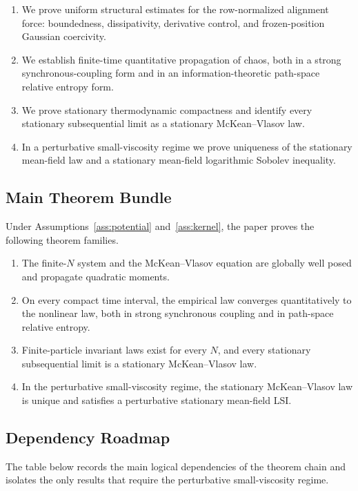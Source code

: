 \documentclass[11pt]{article}
\theoremstyle{definition}
\theoremstyle{remark}
\begin{document}
\begin{enumerate}[leftmargin=1.5em]
\item We prove uniform structural estimates for the row-normalized alignment
force: boundedness, dissipativity, derivative control, and frozen-position
Gaussian coercivity.
\item We establish finite-time quantitative propagation of chaos, both in a
strong synchronous-coupling form and in an information-theoretic path-space
relative entropy form.
\item We prove stationary thermodynamic compactness and identify every
stationary subsequential limit as a stationary McKean--Vlasov law.
\item In a perturbative small-viscosity regime we prove uniqueness of the
stationary mean-field law and a stationary mean-field logarithmic Sobolev
inequality.
\end{enumerate}

\subsection*{Main Theorem Bundle}

Under Assumptions~\ref{ass:potential} and~\ref{ass:kernel}, the paper proves
the following theorem families.
\begin{enumerate}[leftmargin=1.5em]
\item The finite-$N$ system and the McKean--Vlasov equation are globally well
posed and propagate quadratic moments.
\item On every compact time interval, the empirical law converges
quantitatively to the nonlinear law, both in strong synchronous coupling and in
path-space relative entropy.
\item Finite-particle invariant laws exist for every \(N\), and every
stationary subsequential limit is a stationary McKean--Vlasov law.
\item In the perturbative small-viscosity regime, the stationary
McKean--Vlasov law is unique and satisfies a perturbative stationary
mean-field LSI.
\end{enumerate}

\subsection*{Dependency Roadmap}

The table below records the main logical dependencies of the theorem chain and
isolates the only results that require the perturbative small-viscosity regime.
\end{document}
